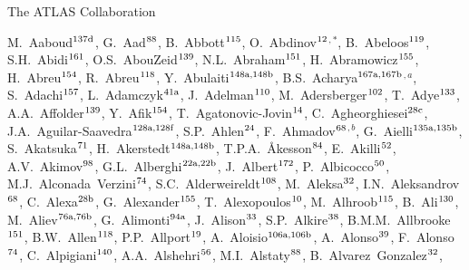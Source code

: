\begin{flushleft}
{\Large The ATLAS Collaboration}

\bigskip

M.~Aaboud$^\textrm{\scriptsize 137d}$,
G.~Aad$^\textrm{\scriptsize 88}$,
B.~Abbott$^\textrm{\scriptsize 115}$,
O.~Abdinov$^\textrm{\scriptsize 12}$$^{,*}$,
B.~Abeloos$^\textrm{\scriptsize 119}$,
S.H.~Abidi$^\textrm{\scriptsize 161}$,
O.S.~AbouZeid$^\textrm{\scriptsize 139}$,
N.L.~Abraham$^\textrm{\scriptsize 151}$,
H.~Abramowicz$^\textrm{\scriptsize 155}$,
H.~Abreu$^\textrm{\scriptsize 154}$,
R.~Abreu$^\textrm{\scriptsize 118}$,
Y.~Abulaiti$^\textrm{\scriptsize 148a,148b}$,
B.S.~Acharya$^\textrm{\scriptsize 167a,167b}$$^{,a}$,
S.~Adachi$^\textrm{\scriptsize 157}$,
L.~Adamczyk$^\textrm{\scriptsize 41a}$,
J.~Adelman$^\textrm{\scriptsize 110}$,
M.~Adersberger$^\textrm{\scriptsize 102}$,
T.~Adye$^\textrm{\scriptsize 133}$,
A.A.~Affolder$^\textrm{\scriptsize 139}$,
Y.~Afik$^\textrm{\scriptsize 154}$,
T.~Agatonovic-Jovin$^\textrm{\scriptsize 14}$,
C.~Agheorghiesei$^\textrm{\scriptsize 28c}$,
J.A.~Aguilar-Saavedra$^\textrm{\scriptsize 128a,128f}$,
S.P.~Ahlen$^\textrm{\scriptsize 24}$,
F.~Ahmadov$^\textrm{\scriptsize 68}$$^{,b}$,
G.~Aielli$^\textrm{\scriptsize 135a,135b}$,
S.~Akatsuka$^\textrm{\scriptsize 71}$,
H.~Akerstedt$^\textrm{\scriptsize 148a,148b}$,
T.P.A.~{\AA}kesson$^\textrm{\scriptsize 84}$,
E.~Akilli$^\textrm{\scriptsize 52}$,
A.V.~Akimov$^\textrm{\scriptsize 98}$,
G.L.~Alberghi$^\textrm{\scriptsize 22a,22b}$,
J.~Albert$^\textrm{\scriptsize 172}$,
P.~Albicocco$^\textrm{\scriptsize 50}$,
M.J.~Alconada~Verzini$^\textrm{\scriptsize 74}$,
S.C.~Alderweireldt$^\textrm{\scriptsize 108}$,
M.~Aleksa$^\textrm{\scriptsize 32}$,
I.N.~Aleksandrov$^\textrm{\scriptsize 68}$,
C.~Alexa$^\textrm{\scriptsize 28b}$,
G.~Alexander$^\textrm{\scriptsize 155}$,
T.~Alexopoulos$^\textrm{\scriptsize 10}$,
M.~Alhroob$^\textrm{\scriptsize 115}$,
B.~Ali$^\textrm{\scriptsize 130}$,
M.~Aliev$^\textrm{\scriptsize 76a,76b}$,
G.~Alimonti$^\textrm{\scriptsize 94a}$,
J.~Alison$^\textrm{\scriptsize 33}$,
S.P.~Alkire$^\textrm{\scriptsize 38}$,
B.M.M.~Allbrooke$^\textrm{\scriptsize 151}$,
B.W.~Allen$^\textrm{\scriptsize 118}$,
P.P.~Allport$^\textrm{\scriptsize 19}$,
A.~Aloisio$^\textrm{\scriptsize 106a,106b}$,
A.~Alonso$^\textrm{\scriptsize 39}$,
F.~Alonso$^\textrm{\scriptsize 74}$,
C.~Alpigiani$^\textrm{\scriptsize 140}$,
A.A.~Alshehri$^\textrm{\scriptsize 56}$,
M.I.~Alstaty$^\textrm{\scriptsize 88}$,
B.~Alvarez~Gonzalez$^\textrm{\scriptsize 32}$,
$$
\end{flushleft}

